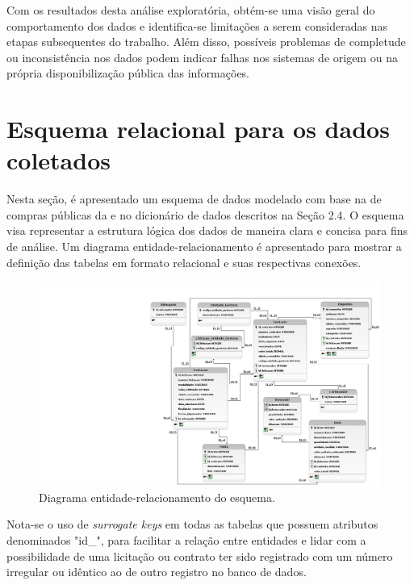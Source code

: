 \documentclass[
	12pt,				%
	oneside,			%
	a4paper,			%
	chapter=TITLE,		%
	section=TITLE,		%
	english,			%
	brazil				%
	]{abntex2}
\begin{document}
Com os resultados desta análise exploratória, obtém-se uma visão geral do comportamento dos dados e identifica-se limitações a serem consideradas nas etapas subsequentes do trabalho. Além disso, possíveis problemas de completude ou inconsistência nos dados podem indicar falhas nos sistemas de origem ou na própria disponibilização pública das informações.

\section{Esquema relacional para os dados coletados}

Nesta seção, é apresentado um esquema de dados modelado com base na  de compras públicas da  e no dicionário de dados descritos na Seção 2.4. O esquema visa representar a estrutura lógica dos dados de maneira clara e concisa para fins de análise. Um diagrama entidade-relacionamento é apresentado para mostrar a definição das tabelas em formato relacional e suas respectivas conexões.

\begin{figure}[h]
\begin{center}
	\caption{\label{fig:diagrama_er}Diagrama entidade-relacionamento do esquema.}
	\includegraphics[trim={17.8cm 0 0 0},clip,width=1.1\textwidth]{images/modelo_logico_tcc_v6.png} %
\end{center}
\end{figure}

Nota-se o uso de \textit{surrogate keys} em todas as tabelas que possuem atributos denominados "id\_<nome da tabela>", para facilitar a relação entre entidades e lidar com a possibilidade de uma licitação ou contrato ter sido registrado com um número irregular ou idêntico ao de outro registro no banco de dados.
\end{document}
